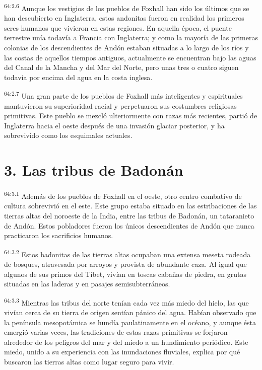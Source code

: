 \par
\textsuperscript{64:2.6} Aunque los vestigios de los pueblos de Foxhall han sido los últimos que se han descubierto en Inglaterra, estos andonitas fueron en realidad los primeros seres humanos que vivieron en estas regiones. En aquella época, el puente terrestre unía todavía a Francia con Inglaterra; y como la mayoría de las primeras colonias de los descendientes de Andón estaban situadas a lo largo de los ríos y las costas de aquellos tiempos antiguos, actualmente se encuentran bajo las aguas del Canal de la Mancha y del Mar del Norte, pero unas tres o cuatro siguen todavía por encima del agua en la costa inglesa.

\par
\textsuperscript{64:2.7} Una gran parte de los pueblos de Foxhall más inteligentes y espirituales mantuvieron su superioridad racial y perpetuaron sus costumbres religiosas primitivas. Este pueblo se mezcló ulteriormente con razas más recientes, partió de Inglaterra hacia el oeste después de una invasión glaciar posterior, y ha sobrevivido como los esquimales actuales.

\section*{3. Las tribus de Badonán}
\par
\textsuperscript{64:3.1} Además de los pueblos de Foxhall en el oeste, otro centro combativo de cultura sobrevivió en el este. Este grupo estaba situado en las estribaciones de las tierras altas del noroeste de la India, entre las tribus de Badonán, un tataranieto de Andón. Estos pobladores fueron los únicos descendientes de Andón que nunca practicaron los sacrificios humanos.

\par
\textsuperscript{64:3.2} Estos badonitas de las tierras altas ocupaban una extensa meseta rodeada de bosques, atravesada por arroyos y provista de abundante caza. Al igual que algunos de sus primos del Tíbet, vivían en toscas cabañas de piedra, en grutas situadas en las laderas y en pasajes semisubterráneos.

\par
\textsuperscript{64:3.3} Mientras las tribus del norte tenían cada vez más miedo del hielo, las que vivían cerca de su tierra de origen sentían pánico del agua. Habían observado que la península mesopotámica se hundía paulatinamente en el océano, y aunque ésta emergió varias veces, las tradiciones de estas razas primitivas se forjaron alrededor de los peligros del mar y del miedo a un hundimiento periódico. Este miedo, unido a su experiencia con las inundaciones fluviales, explica por qué buscaron las tierras altas como lugar seguro para vivir.

